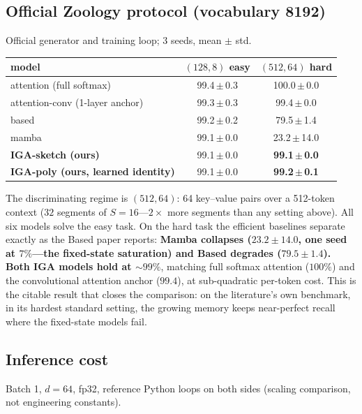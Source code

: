 \documentclass[11pt]{article}
\begin{document}
\subsection{Official Zoology protocol (vocabulary 8192)}

Official generator and training loop; 3 seeds, mean $\pm$ std.

\begin{table}[h]\centering
\begin{tabular}{lcc}
\toprule
model & $(128,8)$ easy & $(512,64)$ hard \\
\midrule
attention (full softmax)          & 99.4\,$\pm$\,0.3 & 100.0\,$\pm$\,0.0 \\
attention-conv (1-layer anchor)   & 99.3\,$\pm$\,0.3 & 99.4\,$\pm$\,0.0 \\
based                             & 99.2\,$\pm$\,0.2 & 79.5\,$\pm$\,1.4 \\
mamba                             & 99.1\,$\pm$\,0.0 & 23.2\,$\pm$\,14.0 \\
\textbf{IGA-sketch (ours)}        & 99.1\,$\pm$\,0.0 & \textbf{99.1\,$\pm$\,0.0} \\
\textbf{IGA-poly (ours, learned identity)} & 99.1\,$\pm$\,0.0 & \textbf{99.2\,$\pm$\,0.1} \\
\bottomrule
\end{tabular}
\end{table}

The discriminating regime is $(512,64)$: 64 key--value pairs over a 512-token
context ($32$ segments of $S=16$---$2\times$ more segments than any setting
above). All six models solve the easy task. On the hard task the efficient
baselines separate exactly as the Based paper reports: \textbf{Mamba collapses
($23.2\pm14.0$, one seed at $7\%$---the fixed-state saturation) and Based degrades
($79.5\pm1.4$).} \textbf{Both IGA models hold at $\sim\!99\%$}, matching full
softmax attention ($100\%$) and the convolutional attention anchor ($99.4$), at
sub-quadratic per-token cost. This is the citable result that closes the
comparison: on the literature's own benchmark, in its hardest standard setting,
the growing memory keeps near-perfect recall where the fixed-state models fail.

\subsection{Inference cost}

Batch 1, $d=64$, fp32, reference Python loops on both sides (scaling comparison,
not engineering constants).
\end{document}
